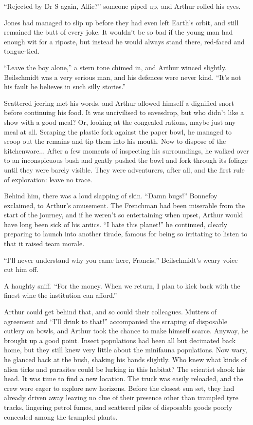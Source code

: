 “Rejected by Dr S again, Alfie?” someone piped up, and Arthur rolled his eyes. 

Jones had managed to slip up before they had even left Earth’s orbit, and still remained the butt of every joke. It wouldn’t be so bad if the young man had enough wit for a riposte, but instead he would always stand there, red-faced and tongue-tied. 

“Leave the boy alone,” a stern tone chimed in, and Arthur winced slightly. Beilschmidt was a very serious man, and his defences were never kind. “It’s not his fault he believes in such silly stories.” 

Scattered jeering met his words, and Arthur allowed himself a dignified snort before continuing his food. It was uncivilised to eavesdrop, but who didn’t like a show with a good meal? Or, looking at the congealed rations, maybe just any meal at all. Scraping the plastic fork against the paper bowl, he managed to scoop out the remains and tip them into his mouth. Now to dispose of the kitchenware... After a few moments of inspecting his surroundings, he walked over to an inconspicuous bush and gently pushed the bowl and fork through its foliage until they were barely visible. They were adventurers, after all, and the first rule of exploration: leave no trace. 

Behind him, there was a loud slapping of skin. “Damn bugs!” Bonnefoy exclaimed, to Arthur’s amusement. The Frenchman had been miserable from the start of the journey, and if he weren’t so entertaining when upset, Arthur would have long been sick of his antics. “I hate this planet!” he continued, clearly preparing to launch into another tirade, famous for being so irritating to listen to that it raised team morale. 

“I’ll never understand why you came here, Francis,” Beilschmidt’s weary voice cut him off. 

A haughty sniff. “For the money. When we return, I plan to kick back with the finest wine the institution can afford.” 

Arthur could get behind that, and so could their colleagues. Mutters of agreement and “I’ll drink to that!” accompanied the scraping of disposable cutlery on bowls, and Arthur took the chance to make himself scarce. Anyway, he brought up a good point. Insect populations had been all but decimated back home, but they still knew very little about the minifauna populations. Now wary, he glanced back at the bush, shaking his hands slightly. Who knew what kinds of alien ticks and parasites could be lurking in this habitat? The scientist shook his head. It was time to find a new location. The truck was easily reloaded, and the crew were eager to explore new horizons. Before the closest sun set, they had already driven away leaving no clue of their presence other than trampled tyre tracks, lingering petrol fumes, and scattered piles of disposable goods poorly concealed among the trampled plants. 

